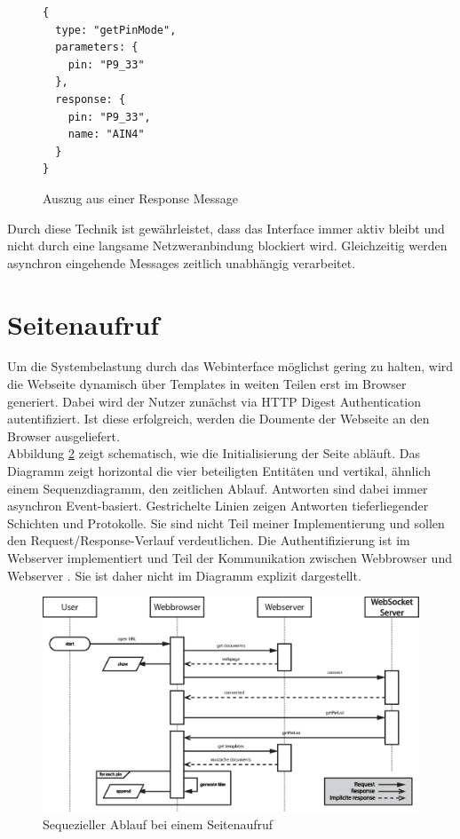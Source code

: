 \begin{figure}[ht]
\begin{lstlisting}
{
  type: "getPinMode",
  parameters: {
    pin: "P9_33"
  },
  response: {
    pin: "P9_33",
    name: "AIN4"
  }
}
\end{lstlisting}
\caption{Auszug aus einer Response Message}
\label{lst:responseMessage}
\end{figure}

Durch diese Technik ist gewährleistet, dass das Interface immer aktiv bleibt und nicht durch eine langsame Netzweranbindung blockiert wird. Gleichzeitig werden asynchron eingehende Messages zeitlich unabhängig verarbeitet.

\section{Seitenaufruf}
Um die Systembelastung durch das Webinterface möglichst gering zu halten, wird die Webseite dynamisch über Templates in weiten Teilen erst im Browser generiert. Dabei wird der Nutzer zunächst via HTTP Digest Authentication autentifiziert. Ist diese erfolgreich, werden die Doumente der Webseite an den Browser ausgeliefert.\\

Abbildung \ref{fig:pageloadSequence} zeigt schematisch, wie die Initialisierung der Seite abläuft. Das Diagramm zeigt horizontal die vier beteiligten Entitäten und vertikal, ähnlich einem Sequenzdiagramm, den zeitlichen Ablauf. Antworten sind dabei immer asynchron Event-basiert. Gestrichelte Linien zeigen Antworten tieferliegender Schichten und Protokolle. Sie sind nicht Teil meiner Implementierung und sollen den Request/Response-Verlauf verdeutlichen. Die Authentifizierung ist im Webserver implementiert und Teil der Kommunikation zwischen Webbrowser und Webserver \cite{rfc7235}. Sie ist daher nicht im Diagramm explizit dargestellt.

\begin{figure}[ht]
  \centering
  \includegraphics[width = \textwidth]{dokumentation/images/pageload.eps}
  \caption{Sequezieller Ablauf bei einem Seitenaufruf}
  \label{fig:pageloadSequence}
\end{figure}


